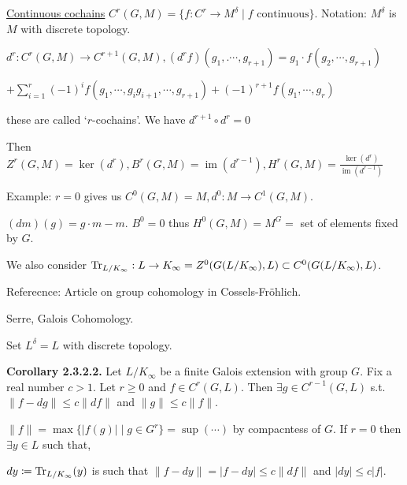 \documentclass{article}
\theoremstyle{definition}
\numberwithin{theorem}{subsection}
\begin{document}
    \underline{Continuous cochains} \(C^r(G,M) = \{ f: C^r \to M^\delta \mid f \text{ continuous} \}\). Notation: \(M^\delta\) is \(M\) with discrete topology.

    \(d^r: C^r(G,M) \to C^{r+1}(G,M), (d^r f)(g_1, .\cdots ,g_{r+1}) = g_1 \cdot f(g_2, \cdots ,g_{r+1})\)
    
    \(+ \sum_{i=1}^r (-1)^i f(g_1, \cdots, g_i g_{i+1}, \cdots, g_{r+1}) + (-1)^{r+1} f(g_1, \cdots , g_r)\) 

    these are called `\(r\)-cochains'. We have \(d^{r+1} \circ d^r = 0\)
    
    Then \(Z^r(G,M) = \ker(d^r), B^r(G,M)=\operatorname{im} (d^{r-1}), H^r(G,M) = \frac{\ker (d^r)}{\operatorname{im}(d^{r-1})}\)
    
    Example: \(r = 0\) gives us \(C^0(G,M) = M, d^0: M \to C^1(G,M)\).

    \((dm)(g) = g \cdot m - m\). \(B^0 = 0\) thus \(H^0(G,M) = M^G =\) set of elements fixed by \(G\).
    
    We also consider \(\Tr_{L / K_\infty}: L \to K_\infty = Z^0(G(L / K_\infty), L) \subset C^0(G(L / K_\infty), L)\).
    
    Referecnce: Article on group cohomology in Cossels-Fr\"ohlich.

    Serre, Galois Cohomology.

    Set \(L^\delta = L\) with discrete topology.

    \textbf{Corollary 2.3.2.2.} Let \(L / K_\infty\) be a finite Galois extension with group \(G\). Fix a real number \(c > 1\). Let \(r \geq 0\) and \(f\in C^r(G,L)\). Then \(\exists g\in C^{r-1} (G,L)\) s.t. \(\lVert f - dg \rVert \leq c \lVert df \rVert \) and \(\lVert g \rVert \leq c \lVert f \rVert\).

    \(\lVert f \rVert = \max \{ \vert f(g) \vert \mid g\in G^r \} = \sup(\cdots)\) by compacntess of \(G\). If \(r = 0\) then \(\exists y\in L\) such that,

    \(dy \coloneqq \Tr_{L / K_\infty}(y)\) is such that \(\lVert f - dy \rVert = \vert f - dy \vert \leq c \lVert df \rVert\) and \(\vert dy \vert \leq c \vert f \vert\).
\end{document}

